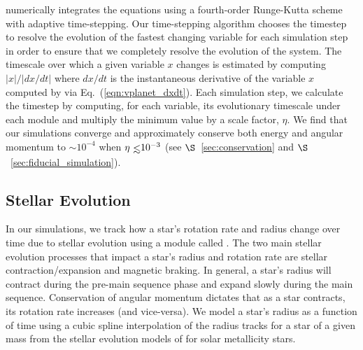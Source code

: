 \vplanet numerically integrates the equations using a fourth-order Runge-Kutta scheme with adaptive time-stepping.  Our time-stepping algorithm chooses the timestep to resolve the evolution of the fastest changing variable for each simulation step in order to ensure that we completely resolve the evolution of the system.  The timescale over which a given variable $x$ changes is estimated by computing $|x|/|dx/dt|$ where $dx/dt$ is the instantaneous derivative of the variable $x$ computed by \vplanet via Eq.~(\ref{eqn:vplanet_dxdt}).  Each simulation step, we calculate the timestep by computing, for each variable, its evolutionary timescale under each module and multiply the minimum value by a scale factor, $\eta$.   We find that our simulations converge and approximately conserve both energy and angular momentum to ${\sim}10^{-4}$ when $\eta \lsim 10^{-3}$ (see $\S$~\ref{sec:conservation} and $\S$~\ref{sec:fiducial_simulation}).



\subsection{Stellar Evolution} \label{sec:stellar_evolution}

In our simulations, we track how a star's rotation rate and radius change over time due to stellar evolution using a module called \stellar.  The two main stellar evolution processes that impact a star's radius and rotation rate are stellar contraction/expansion and magnetic braking.  In general, a star's radius will contract during the pre-main sequence phase and expand slowly during the main sequence.  Conservation of angular momentum dictates that as a star contracts, its rotation rate increases (and vice-versa).  We model a star's radius as a function of time using a cubic spline interpolation of the radius tracks for a star of a given mass from the stellar evolution models of \citet{Baraffe2015} for solar metallicity stars.

